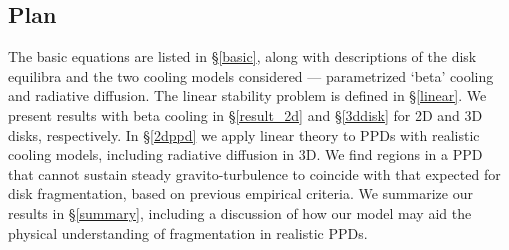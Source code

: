 \documentclass[iop, numberedappendix]{emulateapj}
\begin{document}

\subsection{Plan}

The basic equations are listed in \S\ref{basic}, along with
descriptions of the disk 
equilibra and the two cooling models 
considered --- parametrized `beta' cooling and radiative diffusion. 
The linear stability problem is defined in
\S\ref{linear}. We present results with beta cooling in
\S\ref{result_2d} and \S\ref{3ddisk} for 2D and 3D disks,
respectively. %
In
\S\ref{2dppd} we apply linear theory to PPDs with realistic cooling
models, including radiative diffusion in 3D. We find regions in a
PPD that cannot sustain steady gravito-turbulence to coincide with
that expected for disk fragmentation, based on previous empirical
criteria. We summarize our results in \S\ref{summary}, including a
discussion of how our model may aid the physical understanding of  
fragmentation in realistic PPDs. 





 




\appendix




\end{document}
